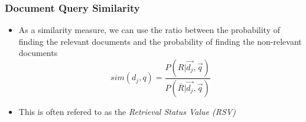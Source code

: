 \documentclass[svgnames]{beamer}
\begin{document}

\begin{frame} \frametitle{Document Query Similarity}

  \begin{block}{}
    \begin{itemize}
    \item As a similarity measure, we can use the ratio between the probability of
      finding the relevant documents and the probability of finding the
      non-relevant documents
      \begin{displaymath}
          sim(d_j,q) = \frac{P(R|\vec{d_j},\vec{q})}{P(\overline{R}|\vec{d_j},\vec{q})}
      \end{displaymath}
     \item This is often refered to as the \emph{Retrieval Status Value (RSV)}
    \end{itemize}
  \end{block}
\end{frame}

\end{document}

